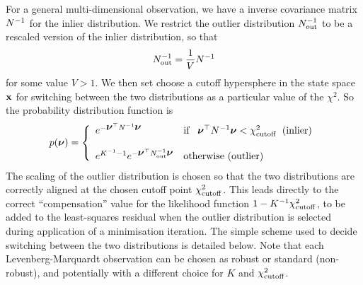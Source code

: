 For a general multi-dimensional observation, we have a inverse covariance
matrix $N^{-1}$ for the inlier distribution.
We restrict the outlier distribution $N_{\rm out}^{-1}$ to be a rescaled version
of the inlier distribution, so that
\[ N_{\rm out}^{-1} = \frac{1}{V} N^{-1}
\]
for some value $V>1$. We then set choose a cutoff hypersphere in the state
space ${\bf x}$ for switching between the two distributions as a particular
value of the $\chi^2$. So the probability distribution function is
\[ p(\mbox{\boldmath $\nu$}) = \left\{ \begin{array}{ll} e^{-\mbox{\boldmath $\nu$}^{\top} N^{-1} \mbox{\boldmath $\nu$}} &
    \mbox{if}\;\;\;\mbox{\boldmath $\nu$}^{\top} N^{-1} \mbox{\boldmath $\nu$} < \chi_{\rm cutoff}^2\;\;\mbox{(inlier)} \\&\\
		 e^{K^{-1} -1} e^{-\mbox{\boldmath $\nu$}^{\top} N_{\rm out}^{-1} \mbox{\boldmath $\nu$}}
  & \mbox{otherwise (outlier)} \end{array} \right.
\]
The scaling of the outlier distribution is chosen so that the two distributions
are correctly aligned at the chosen cutoff point $\chi_{\rm cutoff}^2$.
This leads directly to the correct ``compensation'' value for the likelihood
function $1-K^{-1}\chi_{\rm cutoff}^2$, to be added to the least-squares
residual when the outlier distribution is selected during application
of a minimisation iteration.
The simple scheme used to decide switching between the
two distributions is detailed below.
Note that each Levenberg-Marquardt observation can be chosen as robust
or standard (non-robust), and potentially with a different choice for
$K$ and $\chi_{\rm cutoff}^2$.

